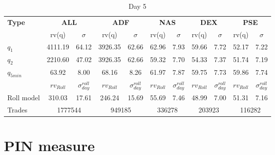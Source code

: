 \documentclass{article}
\begin{document}
\begin{table}[H]
\centering
\begin{adjustbox}{width=\textwidth}
\begin{tabular}{lcccccccccc}
\toprule
\textbf{Type} & \multicolumn{2}{c}{\textbf{ALL}} & \multicolumn{2}{c}{\textbf{ADF}} & \multicolumn{2}{c}{\textbf{NAS}} & \multicolumn{2}{c}{\textbf{DEX}} & \multicolumn{2}{c}{\textbf{PSE}} \\
\cmidrule(lr){2-3} \cmidrule(lr){4-5} \cmidrule(lr){6-7} \cmidrule(lr){8-9} \cmidrule(lr){10-11}
 & rv(q) & $\sigma$ & rv(q) & $\sigma$ & rv(q) & $\sigma$ & rv(q) & $\sigma$ & rv(q) & $\sigma$ \\
\midrule
$q_1$       & 4111.19 & 64.12 & 3926.35 & 62.66 & 62.96 & 7.93 & 59.66 & 7.72 & 52.17 & 7.22 \\
$q_2$       & 2210.60 & 47.02 & 3926.35 & 62.66 & 59.32 & 7.70 & 54.33 & 7.37 & 51.74 & 7.19 \\
$q_{5min}$   & 63.92   & 8.00  & 68.16   & 8.26  & 61.97 & 7.87 & 59.75 & 7.73 & 59.86 & 7.74 \\
\midrule
& {$rv_{Roll}$} & {$\sigma_{day}^{roll}$} & {$rv_{Roll}$} & {$\sigma_{day}^{roll}$} & {$rv_{Roll}$} & {$\sigma_{day}^{roll}$}& {$rv_{Roll}$} & {$\sigma_{day}^{roll}$}& {$rv_{Roll}$} & {$\sigma_{day}^{roll}$} \\
Roll model & 310.03  & 17.61 & 246.24  & 15.69 & 55.69 & 7.46 & 48.99 & 7.00 & 51.31 & 7.16 \\
Trades     & \multicolumn{2}{c}{1777544} & \multicolumn{2}{c}{949185} & \multicolumn{2}{c}{336278} & \multicolumn{2}{c}{203923} & \multicolumn{2}{c}{116282} \\
\bottomrule
\end{tabular}
\end{adjustbox}
\caption{Day 5}
\label{tab:latest_summary_table}
\end{table}

\section{PIN measure}
\end{document}

